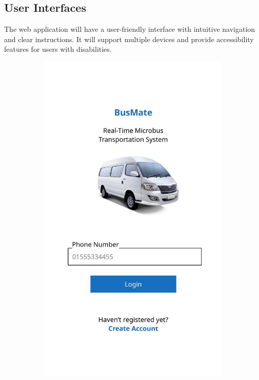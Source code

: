 \documentclass{BusMateSRS}
\begin{document}
\subsection{User Interfaces}
The web application will have a user-friendly interface with intuitive 
navigation and clear instructions. It will support multiple devices and 
provide accessibility features for users with disabilities.

\begin{figure}[ht]
  \centering
  \begin{subfigure}[b]{0.3\textwidth}
    \centering
    \includegraphics[width=\textwidth]{images-ui/ui-out-1.jpg}

\end{subfigure}
\end{figure}
\end{document}

